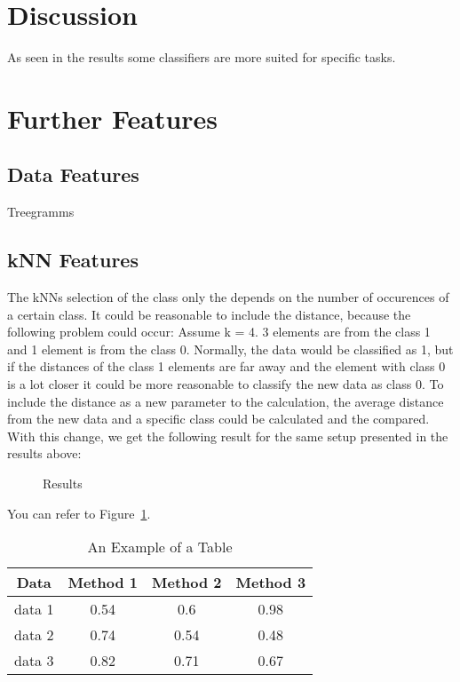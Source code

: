 \documentclass[a4paper,12pt]{article}
\newcommand{\initials}[1]{\marginpar{\quad\texttt{#1}}}
\begin{document}
\section{Discussion}
As seen in the results some classifiers are more suited for specific tasks.
\initials{TB/MA}

\section{Further Features}
\subsection{Data Features}
Treegramms
\initials{TB}
\subsection{kNN Features}
The kNNs selection of the class only the depends on the number of occurences of a certain class. It could be reasonable to include the distance, because the following problem could occur:
Assume k = 4. 3 elements are from the class 1 and 1 element is from the class 0. Normally, the data would be classified as 1, but if the distances of the class 1 elements are far away and the element with class 0 is a lot closer it could be more reasonable to classify the new data as class 0.
To include the distance as a new parameter to the calculation, the average distance from the new data and a specific class could be calculated and the compared. With this change, we get the following result for the same setup presented in the results above:
\begin{figure}[h]
\centering
\caption{Results}
\label{fig_res}
\end{figure}


You can refer to Figure~\ref{fig_res}.
\begin{table}[h]
\caption{An Example of a Table}
\label{tab_example}
\centering
\begin{tabular}{c||c|c|c}
Data & Method 1 & Method 2 & Method 3\\
\hline\hline
data 1 &0.54 & 0.6& 0.98\\
\hline
data 2 &0.74 & 0.54& 0.48\\
\hline
data 3 &0.82 & 0.71& 0.67
\end{tabular}
\end{table}

\initials{MA}  
\end{document}
